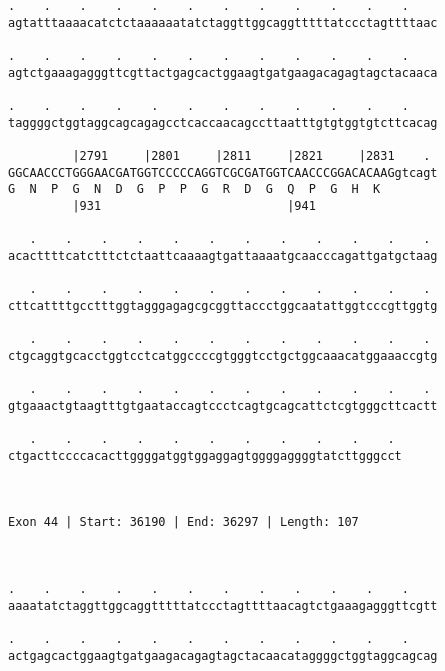 \documentclass{article}
\begin{document}
\begin{Verbatim}
.    .    .    .    .    .    .    .    .    .    .    .    
agtatttaaaacatctctaaaaaatatctaggttggcaggtttttatccctagttttaac
                                                            
.    .    .    .    .    .    .    .    .    .    .    .    
agtctgaaagagggttcgttactgagcactggaagtgatgaagacagagtagctacaaca
                                                            
.    .    .    .    .    .    .    .    .    .    .    .    
taggggctggtaggcagcagagcctcaccaacagccttaatttgtgtggtgtcttcacag
                                                            
         |2791     |2801     |2811     |2821     |2831    . 
GGCAACCCTGGGAACGATGGTCCCCCAGGTCGCGATGGTCAACCCGGACACAAGgtcagt
G  N  P  G  N  D  G  P  P  G  R  D  G  Q  P  G  H  K        
         |931                          |941                 
  
   .    .    .    .    .    .    .    .    .    .    .    . 
acacttttcatctttctctaattcaaaagtgattaaaatgcaacccagattgatgctaag
                                                            
   .    .    .    .    .    .    .    .    .    .    .    . 
cttcattttgcctttggtagggagagcgcggttaccctggcaatattggtcccgttggtg
                                                            
   .    .    .    .    .    .    .    .    .    .    .    . 
ctgcaggtgcacctggtcctcatggccccgtgggtcctgctggcaaacatggaaaccgtg
                                                            
   .    .    .    .    .    .    .    .    .    .    .    . 
gtgaaactgtaagtttgtgaataccagtccctcagtgcagcattctcgtgggcttcactt
                                                            
   .    .    .    .    .    .    .    .    .    .    . 
ctgacttccccacacttggggatggtggaggagtggggaggggtatcttgggcct
                                                       
                                                       
 
Exon 44 | Start: 36190 | End: 36297 | Length: 107



.    .    .    .    .    .    .    .    .    .    .    .    
aaaatatctaggttggcaggtttttatccctagttttaacagtctgaaagagggttcgtt
                                                            
.    .    .    .    .    .    .    .    .    .    .    .    
actgagcactggaagtgatgaagacagagtagctacaacataggggctggtaggcagcag
                                                            

\end{Verbatim}
\end{document}
